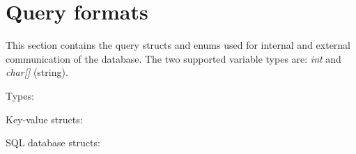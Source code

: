 \section{Query formats}
\label{sec:appendix-queries}
This section contains the query structs and enums used for internal and external communication of the database. The two supported variable types are: \textit{int} and \textit{char[]} (string).

\large Types:



\large Key-value structs:



\large SQL database structs:

